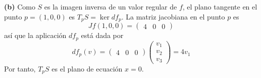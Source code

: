 \documentclass[12pt]{report}
\begin{document}
\vspace{2mm}
\noindent \textbf{(b) } Como $S$ es la imagen inversa de un valor regular de $f$, el plano tangente en el punto $p = (1,0,0)$ es $T_pS = \ker df_p$. La matriz jacobiana en el punto $p$ es
\[Jf(1,0,0) = \begin{pmatrix}
    4 & 0 & 0
\end{pmatrix}\]
así que la aplicación $df_p$ está dada por
\[df_p(v)  = \begin{pmatrix}
    4 & 0 & 0
\end{pmatrix} \begin{pmatrix}
    v_1 \\
    v_2 \\
    v_3 
\end{pmatrix} = 4v_1\]
Por tanto, $T_pS$ es el plano de ecuación $x = 0$.
\end{document}
